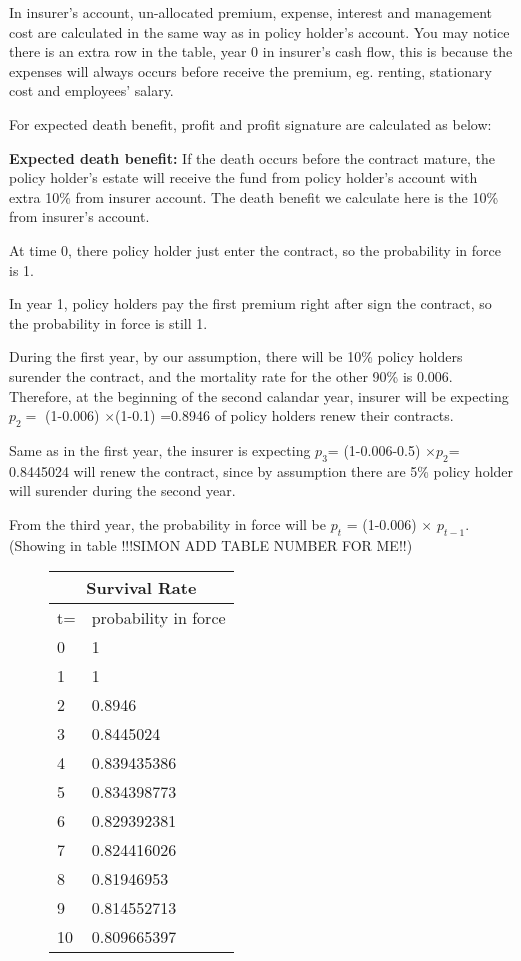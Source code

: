 \documentclass{report}
\begin{document}
In insurer's account, un-allocated premium, expense, interest and management cost are calculated in the same way as in policy holder's account. You may notice there is an extra row in the table, year 0 in insurer's cash flow, this is because the expenses will always occurs before receive the premium, eg. renting, stationary cost and employees' salary. 

For expected death benefit, profit and profit signature are calculated as below:

\textbf{Expected death benefit:} If the death occurs before the contract mature, the policy holder's estate will receive the fund from policy holder's account with extra 10\% from insurer account. The death benefit we calculate here is the 10\% from insurer's account. 

At time 0, there policy holder just enter the contract, so the probability in force is 1.

In year 1, policy holders pay the first premium right after sign the contract, so the probability in force is still 1. 

During the first year, by our assumption, there will be 10\% policy holders surender the contract, and the mortality rate for the other 90\% is 0.006. Therefore, at the beginning of the second calandar year, insurer will be expecting $p_2=$ (1-0.006) $\times$(1-0.1) =0.8946 of policy holders renew their contracts. 

Same as in the first year, the insurer is expecting $p_3$= (1-0.006-0.5) $\times$$p_2$= 0.8445024 will renew the contract, since by assumption there are 5\% policy holder will surender during the second year.

From the third year, the probability in force will be $p_t$ = (1-0.006) $\times$ $p_{t-1}$. (Showing in table !!!SIMON ADD TABLE NUMBER FOR ME!!)


\begin{figure}[h]
\begin{tabular}{|l|l|}
  \hline
  \multicolumn{2}{|c|}{Survival Rate} \\
  \hline
t=	&probability in force\\
0	&1\\
1	&1\\
2	&0.8946\\
3	&0.8445024\\
4	&0.839435386\\
5	&0.834398773\\
6	&0.829392381\\
7	&0.824416026\\
8	&0.81946953\\
9	&0.814552713\\
10	&0.809665397\\
  \hline
\end{tabular}
\end{figure}
\end{document}
